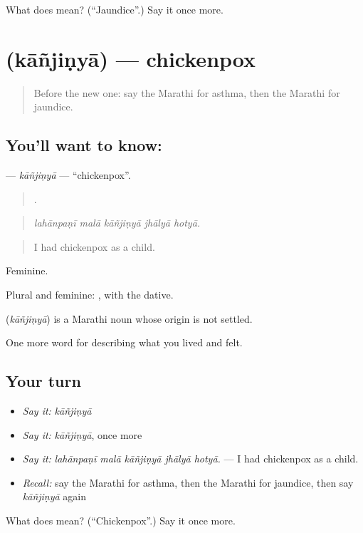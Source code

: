 \begin{tcolorbox}[breakable,colback=teal!4,colframe=teal!35!black,title={Before you move on}]
What does  mean? (\textquotedblleft{}Jaundice\textquotedblright{}.) Say it once more.
\end{tcolorbox}
\section[\texorpdfstring{\mr{कांजिण्या} (kāñjiṇyā)}{कांजिण्या (kāñjiṇyā)}]{ (kāñjiṇyā) — chickenpox}

\label{lesson:MR-C485-kanjinya}



\begin{quote}
Before the new one: say the Marathi for asthma, then the Marathi for jaundice.
\end{quote}

\subsection*{You'll want to know: }
\textbf{} — \emph{kāñjiṇyā} — \textquotedblleft{}chickenpox\textquotedblright{}.

\begin{quote}
    .
\end{quote}

\begin{quote}
\emph{lahānpaṇī malā kāñjiṇyā jhālyā hotyā.}
\end{quote}

\begin{quote}
I had chickenpox as a child.
\end{quote}

Feminine.

Plural and feminine:  , with the dative.

\begin{cousinweb}
\textbf{} (\emph{kāñjiṇyā}) is a Marathi noun whose origin is not settled.
\end{cousinweb}

\begin{grammarlens}[title={What you've built}]
One more word for describing what you lived and felt.
\end{grammarlens}

\subsection*{Your turn}
\begin{itemize}
\raggedright
  \item \emph{Say it:} \emph{kāñjiṇyā}
  \item \emph{Say it:} \emph{kāñjiṇyā}, once more
  \item \emph{Say it:} \emph{lahānpaṇī malā kāñjiṇyā jhālyā hotyā.} — I had chickenpox as a child.
  \item \emph{Recall:} say the Marathi for asthma, then the Marathi for jaundice, then say \emph{kāñjiṇyā} again
\end{itemize}

\begin{tcolorbox}[breakable,colback=teal!4,colframe=teal!35!black,title={Before you move on}]
What does  mean? (\textquotedblleft{}Chickenpox\textquotedblright{}.) Say it once more.
\end{tcolorbox}
